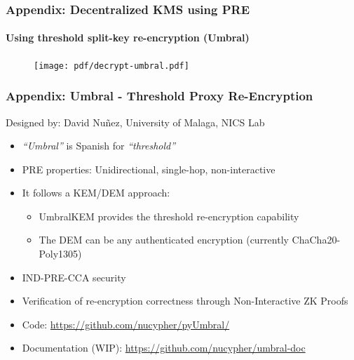 \documentclass[xetex,mathsans,sans,aspectratio=169]{beamer}
\begin{document}
    \begin{frame}
        \frametitle{Appendix: Decentralized KMS using PRE}
        \framesubtitle{Using threshold split-key re-encryption (Umbral)}
        \begin{figure}
            \centering
            \texttt{[image: pdf/decrypt-umbral.pdf]}
        \end{figure}
    \end{frame}

    \begin{frame}
      \frametitle{Appendix: Umbral - Threshold Proxy Re-Encryption}
      Designed by: David Nu\~{n}ez, University of Malaga, NICS Lab
      \begin{itemize}
          \item \emph{``Umbral''} is Spanish for \emph{``threshold''}
          \item PRE properties: Unidirectional, single-hop, non-interactive
          \item It follows a KEM/DEM approach:
          \begin{itemize}
              \item UmbralKEM provides the threshold re-encryption capability
              \item The DEM can be any authenticated encryption (currently ChaCha20-Poly1305)
          \end{itemize}
          \item IND-PRE-CCA security
          \item Verification of re-encryption correctness through Non-Interactive ZK Proofs
          \item Code: \url{https://github.com/nucypher/pyUmbral/}
          \item Documentation (WIP): \url{https://github.com/nucypher/umbral-doc}
      \end{itemize}
    \end{frame}
\end{document}
